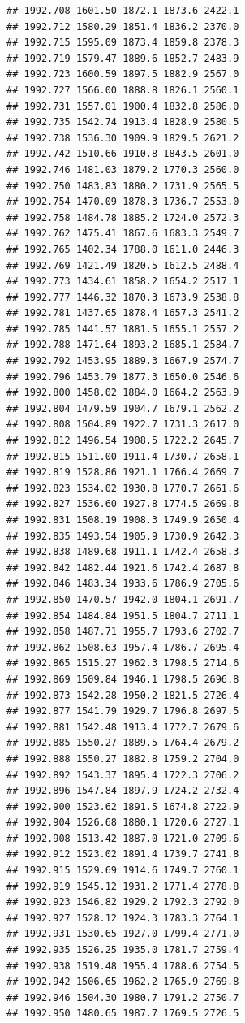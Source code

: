 \documentclass[
]{book}
\begin{document}
\begin{verbatim}
## 1992.708 1601.50 1872.1 1873.6 2422.1
## 1992.712 1580.29 1851.4 1836.2 2370.0
## 1992.715 1595.09 1873.4 1859.8 2378.3
## 1992.719 1579.47 1889.6 1852.7 2483.9
## 1992.723 1600.59 1897.5 1882.9 2567.0
## 1992.727 1566.00 1888.8 1826.1 2560.1
## 1992.731 1557.01 1900.4 1832.8 2586.0
## 1992.735 1542.74 1913.4 1828.9 2580.5
## 1992.738 1536.30 1909.9 1829.5 2621.2
## 1992.742 1510.66 1910.8 1843.5 2601.0
## 1992.746 1481.03 1879.2 1770.3 2560.0
## 1992.750 1483.83 1880.2 1731.9 2565.5
## 1992.754 1470.09 1878.3 1736.7 2553.0
## 1992.758 1484.78 1885.2 1724.0 2572.3
## 1992.762 1475.41 1867.6 1683.3 2549.7
## 1992.765 1402.34 1788.0 1611.0 2446.3
## 1992.769 1421.49 1820.5 1612.5 2488.4
## 1992.773 1434.61 1858.2 1654.2 2517.1
## 1992.777 1446.32 1870.3 1673.9 2538.8
## 1992.781 1437.65 1878.4 1657.3 2541.2
## 1992.785 1441.57 1881.5 1655.1 2557.2
## 1992.788 1471.64 1893.2 1685.1 2584.7
## 1992.792 1453.95 1889.3 1667.9 2574.7
## 1992.796 1453.79 1877.3 1650.0 2546.6
## 1992.800 1458.02 1884.0 1664.2 2563.9
## 1992.804 1479.59 1904.7 1679.1 2562.2
## 1992.808 1504.89 1922.7 1731.3 2617.0
## 1992.812 1496.54 1908.5 1722.2 2645.7
## 1992.815 1511.00 1911.4 1730.7 2658.1
## 1992.819 1528.86 1921.1 1766.4 2669.7
## 1992.823 1534.02 1930.8 1770.7 2661.6
## 1992.827 1536.60 1927.8 1774.5 2669.8
## 1992.831 1508.19 1908.3 1749.9 2650.4
## 1992.835 1493.54 1905.9 1730.9 2642.3
## 1992.838 1489.68 1911.1 1742.4 2658.3
## 1992.842 1482.44 1921.6 1742.4 2687.8
## 1992.846 1483.34 1933.6 1786.9 2705.6
## 1992.850 1470.57 1942.0 1804.1 2691.7
## 1992.854 1484.84 1951.5 1804.7 2711.1
## 1992.858 1487.71 1955.7 1793.6 2702.7
## 1992.862 1508.63 1957.4 1786.7 2695.4
## 1992.865 1515.27 1962.3 1798.5 2714.6
## 1992.869 1509.84 1946.1 1798.5 2696.8
## 1992.873 1542.28 1950.2 1821.5 2726.4
## 1992.877 1541.79 1929.7 1796.8 2697.5
## 1992.881 1542.48 1913.4 1772.7 2679.6
## 1992.885 1550.27 1889.5 1764.4 2679.2
## 1992.888 1550.27 1882.8 1759.2 2704.0
## 1992.892 1543.37 1895.4 1722.3 2706.2
## 1992.896 1547.84 1897.9 1724.2 2732.4
## 1992.900 1523.62 1891.5 1674.8 2722.9
## 1992.904 1526.68 1880.1 1720.6 2727.1
## 1992.908 1513.42 1887.0 1721.0 2709.6
## 1992.912 1523.02 1891.4 1739.7 2741.8
## 1992.915 1529.69 1914.6 1749.7 2760.1
## 1992.919 1545.12 1931.2 1771.4 2778.8
## 1992.923 1546.82 1929.2 1792.3 2792.0
## 1992.927 1528.12 1924.3 1783.3 2764.1
## 1992.931 1530.65 1927.0 1799.4 2771.0
## 1992.935 1526.25 1935.0 1781.7 2759.4
## 1992.938 1519.48 1955.4 1788.6 2754.5
## 1992.942 1506.65 1962.2 1765.9 2769.8
## 1992.946 1504.30 1980.7 1791.2 2750.7
## 1992.950 1480.65 1987.7 1769.5 2726.5

\end{verbatim}
\end{document}
